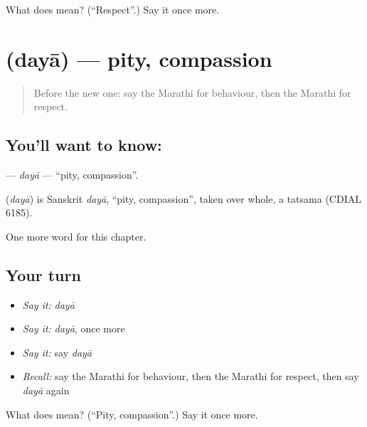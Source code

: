 \begin{tcolorbox}[breakable,colback=teal!4,colframe=teal!35!black,title={Before you move on}]
What does  mean? (\textquotedblleft{}Respect\textquotedblright{}.) Say it once more.
\end{tcolorbox}
\section[\texorpdfstring{\mr{दया} (dayā)}{दया (dayā)}]{ (dayā) — pity, compassion}

\label{lesson:MR-C273-daya}



\begin{quote}
Before the new one: say the Marathi for behaviour, then the Marathi for respect.
\end{quote}

\subsection*{You'll want to know: }
\textbf{} — \emph{dayā} — \textquotedblleft{}pity, compassion\textquotedblright{}.

\begin{cousinweb}
\textbf{} (\emph{dayā}) is Sanskrit \emph{dayā}, \textquotedblleft{}pity, compassion\textquotedblright{}, taken over whole, a tatsama (CDIAL 6185).
\end{cousinweb}

\begin{grammarlens}[title={What you've built}]
One more word for this chapter.
\end{grammarlens}

\subsection*{Your turn}
\begin{itemize}
\raggedright
  \item \emph{Say it:} \emph{dayā}
  \item \emph{Say it:} \emph{dayā}, once more
  \item \emph{Say it:} say \emph{dayā}
  \item \emph{Recall:} say the Marathi for behaviour, then the Marathi for respect, then say \emph{dayā} again
\end{itemize}

\begin{tcolorbox}[breakable,colback=teal!4,colframe=teal!35!black,title={Before you move on}]
What does  mean? (\textquotedblleft{}Pity, compassion\textquotedblright{}.) Say it once more.
\end{tcolorbox}

